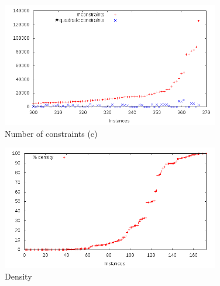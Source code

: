 \begin{figure}\centering
  \includegraphics[width=0.85\textwidth]{pic_constr_big.png}
  \caption{Number of constraints (c) \label{fig:pic_constr_big}}
\end{figure}




\begin{figure}\centering
  \includegraphics[width=0.85\textwidth]{pic_density.png}
  \caption{Density \label{fig:pic_density}}
\end{figure}

